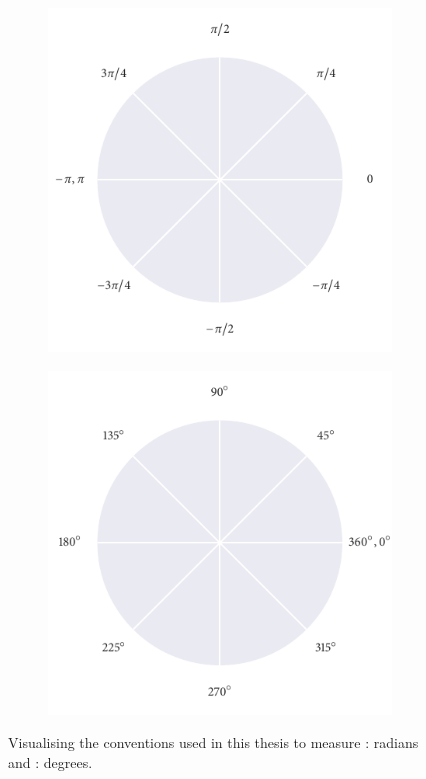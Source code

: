 \begin{figure}[tb]
\centering
	\begin{subfigure}[b]{0.5\textwidth}
		\includegraphics{radian_axes.pdf}
		\caption{}
		\label{subfig:radian_axes}
	\end{subfigure}%
	\begin{subfigure}[b]{0.5\textwidth}
		\centering
		\includegraphics{degree_axes.pdf}
		\caption{}
		\label{subfig:degree_axes}
	\end{subfigure}
    \caption{Visualising the conventions used in this thesis to measure
        : radians and : degrees.}
	\label{fig:compare_axes}
\end{figure}

